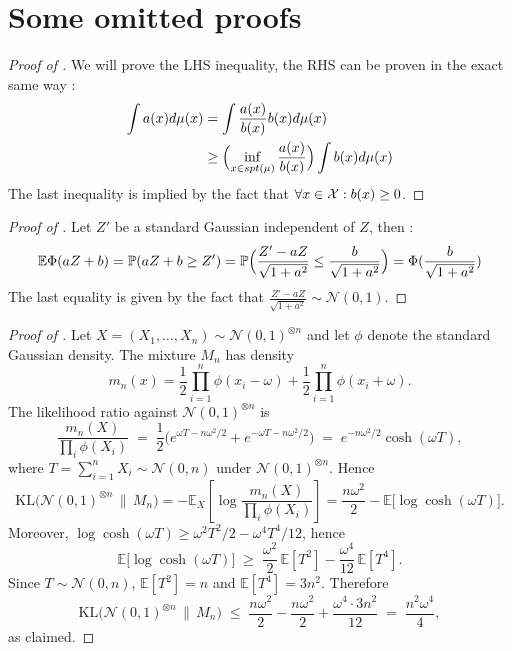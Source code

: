 \section{Some omitted proofs}
\begin{proof}[Proof of ]
    We will prove the LHS inequality, the RHS can be proven in the exact same way : \begin{align*}
        \int a(x) d\mu(x) &= \int \frac{a(x)}{b(x)} b(x) d\mu(x) \\
        &\geq \Bigl(\inf_{x \in spt(\mu)} \frac{a(x)}{b(x)}\Bigr) \int b(x) d\mu(x)
    \end{align*}
    The last inequality is implied by the fact that $\forall x\in \mathcal{X} : b(x) \geq 0$.
\end{proof}
\begin{proof}[Proof of ]
    Let $Z'$ be a standard Gaussian independent of $Z$, then : 
    \begin{equation*}
        \mathbb{E}\Phi(aZ+b) = \mathbb{P}(aZ+b\geq Z') = \mathbb{P} \Bigl(\frac{Z'-aZ}{\sqrt{1+a^2}} \leq \frac{b}{\sqrt{1+a^2}}\Bigr) = \Phi(\frac{b}{\sqrt{1+a^2}})
    \end{equation*}
    The last equality is given by the fact that $\frac{Z'-aZ}{\sqrt{1+a^2}} \sim \mathcal{N}(0,1)$.
\end{proof} 
\begin{proof}[Proof of ]
Let $X = (X_1, \ldots, X_n) \sim \mathcal{N}(0,1)^{\otimes n}$ and let $\phi$ denote the
standard Gaussian density. The mixture $M_n$ has density
\[
    m_n(x) = \frac{1}{2}\prod_{i=1}^{n}\phi(x_i - \omega)
            + \frac{1}{2}\prod_{i=1}^{n}\phi(x_i + \omega).
\]
The likelihood ratio against $\mathcal{N}(0,1)^{\otimes n}$ is
\[
    \frac{m_n(X)}{\prod_i \phi(X_i)}
    \;=\; \frac{1}{2}\bigl(e^{\omega T - n\omega^2/2} + e^{-\omega T - n\omega^2/2}\bigr)
    \;=\; e^{-n\omega^2/2}\cosh(\omega T),
\]
where $T = \sum_{i=1}^n X_i \sim \mathcal{N}(0, n)$ under $\mathcal{N}(0,1)^{\otimes n}$.
Hence
\[
    \mathrm{KL}\bigl(\mathcal{N}(0,1)^{\otimes n} \,\|\, M_n\bigr)
    = -\mathbb{E}_X\!\left[\log \frac{m_n(X)}{\prod_i \phi(X_i)}\right]
    = \frac{n\omega^2}{2} - \mathbb{E}\bigl[\log\cosh(\omega T)\bigr].
\]
Moreover, $\log\cosh(\omega T) \geq \omega^2 T^2/2 - \omega^4 T^4/12$, hence
\[
    \mathbb{E}\bigl[\log\cosh(\omega T)\bigr]
    \;\geq\; \frac{\omega^2}{2}\,\mathbb{E}[T^2] - \frac{\omega^4}{12}\,\mathbb{E}[T^4].
\]
Since $T \sim \mathcal{N}(0,n)$, $\mathbb{E}[T^2] = n$ and $\mathbb{E}[T^4] = 3n^2$.
Therefore
\[
    \mathrm{KL}\bigl(\mathcal{N}(0,1)^{\otimes n} \,\|\, M_n\bigr)
    \;\leq\; \frac{n\omega^2}{2} - \frac{n\omega^2}{2} + \frac{\omega^4 \cdot 3n^2}{12}
    \;=\; \frac{n^2\omega^4}{4},
\]
as claimed.
\end{proof}
